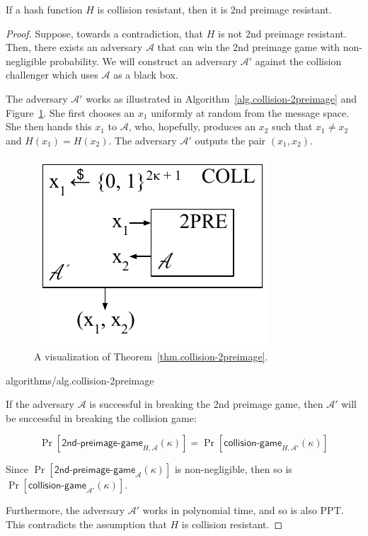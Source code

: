 \begin{theorem}
  \label{thm.collision-2preimage}
  If a hash function $H$ is collision resistant, then it is 2nd preimage resistant.
\end{theorem}
\begin{proof}
  Suppose, towards a contradiction, that $H$ is not 2nd preimage resistant.
  Then, there exists an adversary $\mathcal{A}$ that can win the 2nd preimage game with non-negligible probability. We will construct an adversary $\mathcal{A}'$ against the
  collision challenger which uses $\mathcal{A}$ as a black box.

  The adversary $\mathcal{A}'$ works as illustrated in Algorithm~\ref{alg.collision-2preimage} and Figure~\ref{fig:2pre-collision}. She first chooses an $x_1$ uniformly at random from the message space. She then hands this $x_1$ to $\mathcal{A}$, who, hopefully, produces an $x_2$ such that $x_1 \neq x_2$ and $H(x_1) = H(x_2)$. The adversary $\mathcal{A}'$ outputs the pair $(x_1, x_2)$.

  \begin{figure}[H]
      \centering
      \includegraphics[scale=0.65]{figures/2pre-collision.pdf}
      \caption{A visualization of Theorem~\ref{thm.collision-2preimage}.}
      \label{fig:2pre-collision}
  \end{figure}

  {algorithms/alg.collision-2preimage}

  If the adversary $\mathcal{A}$ is successful in breaking the 2nd preimage game, then $\mathcal{A}'$ will be successful in breaking the collision game:

  \[
    \Pr[\textsf{2nd-preimage-game}_{H,\mathcal{A}}(\kappa)]
    =
    \Pr[\textsf{collision-game}_{H,\mathcal{A}'}(\kappa)]
  \]

  Since $\Pr[\textsf{2nd-preimage-game}_\mathcal{A}(\kappa)]$ is non-negligible, then so is $\Pr[\textsf{collision-game}_{\mathcal{A}'}(\kappa)]$.

  Furthermore, the adversary $\mathcal{A}'$ works in polynomial time, and so is also PPT. This contradicts the assumption that $H$ is collision resistant.
\end{proof}

